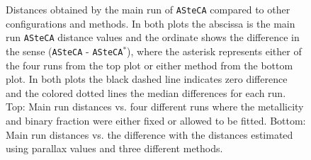 \documentclass{aa}
\begin{document}
  \begin{figure}
   \caption{Distances obtained by the main run of \texttt{ASteCA} compared to
   other configurations and methods.   
   In both plots the abscissa is the main run \texttt{ASteCA} distance values
   and the ordinate shows the difference in the sense (\texttt{ASteCA} - 
   \texttt{ASteCA}$^*$), where the asterisk represents either of the four runs
   from the top plot or either method from the bottom plot.
   In both plots the black dashed line indicates zero difference and the colored
   dotted lines  the median differences for each run.
   Top: Main run distances vs. four different runs where the metallicity and
   binary fraction were either fixed or allowed to be fitted.
   Bottom: Main run distances vs. the difference with the distances
   estimated using parallax values and three different methods.}
   \label{fig:dist_comparisions}
  \end{figure}
\end{document}
